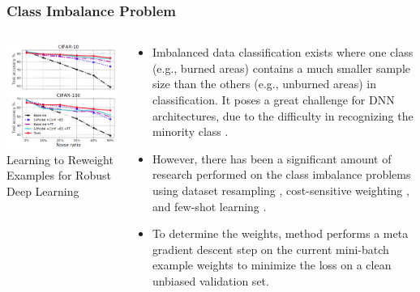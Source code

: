 \documentclass{beamer}
\begin{document}
\begin{frame}
  \frametitle{Class Imbalance Problem}


\begin{columns}[T]
    \begin{column}{.5\textwidth}
     
    \includegraphics[width=1.0\textwidth]{figs/icml_2018.PNG}
  \\
  \tiny
  Learning to Reweight Examples for Robust Deep Learning 
\citep{pmlr-v80-ren18a}
    \end{column}
    \begin{column}{.5\textwidth}
    \scriptsize
\begin{itemize}
 \item Imbalanced data classification
exists where one class (e.g., burned areas) contains a much
smaller sample size than the others (e.g., unburned areas) in
classification. It poses a great challenge for DNN architectures,
due to the difficulty in recognizing the minority class \citep{Sze-To2017}.
\item However, there has been a significant amount of research
performed on the class imbalance problems using dataset
resampling \citep{Chawla02smote:synthetic}, cost-sensitive weighting 
\citep{Ting:2000:CSC:645529.657944}, and few-shot
learning \citep{Sachin2017}.
\item To
determine the weights, \cite{pmlr-v80-ren18a} method
performs a meta gradient descent step on the
current mini-batch example weights to minimize the loss on
a clean unbiased validation set.
\end{itemize}
    
    \end{column}
\end{columns}

\end{frame}
\end{document}
